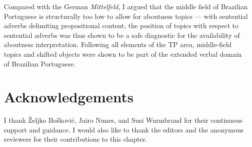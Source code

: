 \documentclass[output=paper]{langscibook}
\begin{document}
Compared with the German \emph{Mittelfeld}, I argued that the middle field of Brazilian Portuguese is structurally too low to allow for aboutness topics — with sentential adverbs delimiting propositional content, the position of topics with respect to sentential adverbs was thus shown to be a safe diagnostic for the availability of aboutness interpretation. Following all elements of the TP area, middle-field topics and shifted objects were shown to be part of the extended verbal domain of Brazilian Portuguese.

\begin{comment}
\newpage
\section*{Abbreviations}
\begin{tabularx}{.45\textwidth}{lQ}
... & \\
... & \\
\end{tabularx}
\begin{tabularx}{.45\textwidth}{lQ}
... & \\
... & \\
\end{tabularx}
\end{comment}

\section*{Acknowledgements}
I thank Željko Bošković, Jairo Nunes, and Susi Wurmbrand for their continuous support and guidance. 
I would also like to thank the editors and the anonymous reviewers for their contributions to this chapter.

\printbibliography[heading=subbibliography,notkeyword=this]
\end{document}
